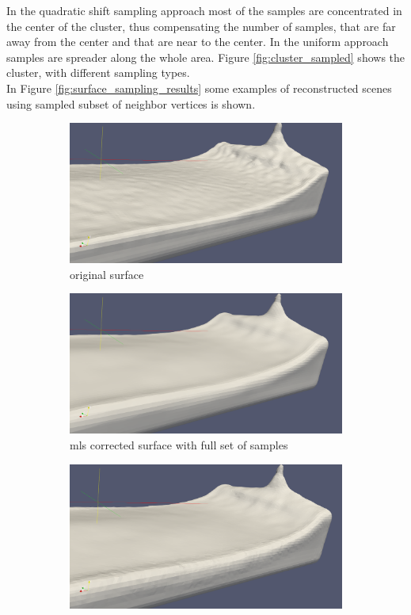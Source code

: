 In the quadratic shift sampling approach most of the samples are concentrated in the center of the cluster, thus compensating the number of samples, that are far away from the center and that are near to the center. In the uniform approach samples are spreader along the whole area. Figure \ref{fig:cluster_sampled} shows the cluster, with different sampling types.\\
In Figure \ref{fig:surface_sampling_results} some examples of reconstructed scenes using sampled subset of neighbor vertices is shown.
\begin{figure}
	\begin{center}
		\begin{subfigure}[b]{\textwidth}
			\includegraphics[width=\textwidth]{figures/MLSSurfaceOriginal.png}
			\caption{original surface}
		\end{subfigure}
		\begin{subfigure}[b]{\textwidth}
			\includegraphics[width=\textwidth]{figures/MLSSurfaceSamplingFullSet.png}
			\caption{mls corrected surface with full set of samples}
		\end{subfigure}
		\begin{subfigure}[b]{\textwidth}
			\includegraphics[width=\textwidth]{figures/MLSSurfaceSamplingQuarterSet.png}

\end{subfigure}
\end{center}
\end{figure}
